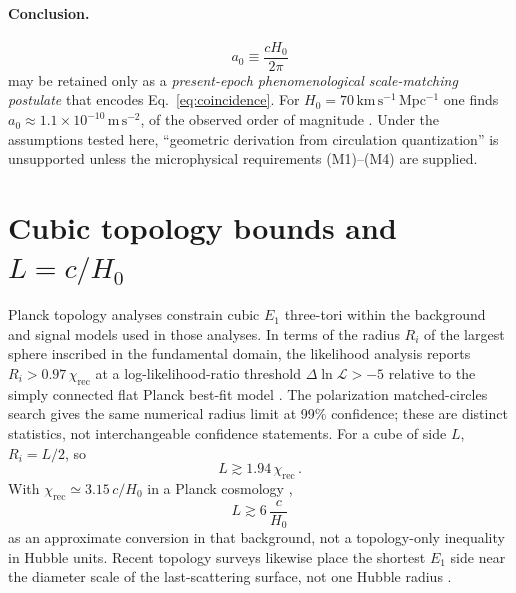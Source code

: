 \documentclass[aps,prd,reprint,superscriptaddress,nofootinbib,floatfix,showkeys]{revtex4-2}
\newcommand{\azero}{a_{0}}
\newcommand{\Hzero}{H_{0}}
\begin{document}
\paragraph{Conclusion.}
\begin{equation}
  \azero \equiv \frac{c\Hzero}{2\pi}
  \label{eq:a0-phen}
\end{equation}
may be retained only as a \emph{present-epoch phenomenological scale-matching
postulate} that encodes Eq.~\eqref{eq:coincidence}.  For
\(\Hzero=70\,\mathrm{km\,s^{-1}\,Mpc^{-1}}\) one finds
\(\azero\approx 1.1\times 10^{-10}\,\mathrm{m\,s^{-2}}\), of the observed
order of magnitude \cite{mcgaugh_rar}.  Under the assumptions tested here,
``geometric derivation from circulation quantization'' is unsupported unless
the microphysical requirements (M1)--(M4) are supplied.

\section{Cubic topology bounds and \texorpdfstring{\(L=c/\Hzero\)}{L = c/H0}}
\label{sec:bounds}

Planck topology analyses constrain cubic \(E_1\) three-tori within the
background and signal models used in those analyses. In terms of the radius
\(R_i\) of the largest sphere inscribed in the fundamental domain, the
likelihood analysis reports \(R_i>0.97\,\chi_{\mathrm{rec}}\) at a
log-likelihood-ratio threshold \(\Delta\ln\mathcal L>-5\) relative to the
simply connected flat Planck best-fit model \cite{planck_topology}.
The polarization matched-circles search gives the same numerical radius
limit at 99\% confidence; these are distinct statistics, not interchangeable
confidence statements. For a cube of side \(L\),
\(R_i=L/2\), so
\begin{equation}
  L \gtrsim 1.94\,\chi_{\mathrm{rec}}\,.
  \label{eq:L-chi}
\end{equation}
With \(\chi_{\mathrm{rec}}\simeq 3.15\,c/\Hzero\) in a Planck cosmology
\cite{planck},
\begin{equation}
  L \gtrsim 6\,\frac{c}{\Hzero}
  \label{eq:L-H}
\end{equation}
as an approximate conversion in that background, not a topology-only
inequality in Hubble units. Recent topology surveys likewise place the shortest
\(E_1\) side near the diameter scale of the last-scattering surface, not one
Hubble radius \cite{compact_promise,planck_topology}.
\end{document}
